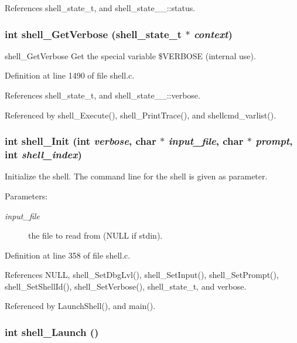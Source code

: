 References shell\_\-state\_\-t, and shell\_\-state\_\-\_\-::status.
\subsubsection{\setlength{\rightskip}{0pt plus 5cm}int shell\_\-Get\-Verbose ({\bf shell\_\-state\_\-t} $\ast$ {\em context})}\label{shell_8c_a34}


shell\_\-Get\-Verbose Get the special variable \$VERBOSE (internal use). 

Definition at line 1490 of file shell.c.

References shell\_\-state\_\-t, and shell\_\-state\_\-\_\-::verbose.

Referenced by shell\_\-Execute(), shell\_\-Print\-Trace(), and shellcmd\_\-varlist().
\subsubsection{\setlength{\rightskip}{0pt plus 5cm}int shell\_\-Init (int {\em verbose}, char $\ast$ {\em input\_\-file}, char $\ast$ {\em prompt}, int {\em shell\_\-index})}\label{shell_8c_a16}


Initialize the shell. The command line for the shell is given as parameter. \begin{Desc}
\item[Parameters:]
\begin{description}
\item[{\em input\_\-file}]the file to read from (NULL if stdin). \end{description}
\end{Desc}


Definition at line 358 of file shell.c.

References NULL, shell\_\-Set\-Dbg\-Lvl(), shell\_\-Set\-Input(), shell\_\-Set\-Prompt(), shell\_\-Set\-Shell\-Id(), shell\_\-Set\-Verbose(), shell\_\-state\_\-t, and verbose.

Referenced by Launch\-Shell(), and main().
\subsubsection{\setlength{\rightskip}{0pt plus 5cm}int shell\_\-Launch ()}\label{shell_8c_a18}



